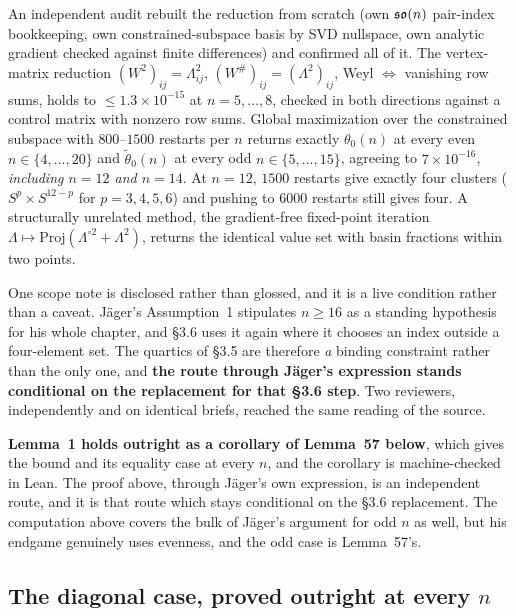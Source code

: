 \begin{certificate}
An independent audit rebuilt the reduction from scratch (own $\mathfrak{so}(n)$ pair-index bookkeeping, own constrained-subspace basis by SVD nullspace, own analytic gradient checked against finite differences) and confirmed all of it. The vertex-matrix reduction $(W^2)_{ij}=\Lambda_{ij}^2$, $(W^{\#})_{ij}=(\Lambda^2)_{ij}$, Weyl $\iff$ vanishing row sums, holds to $\le1.3\times10^{-15}$ at $n=5,\dots,8$, checked in both directions against a control matrix with nonzero row sums. Global maximization over the constrained subspace with $800$--$1500$ restarts per $n$ returns exactly $\theta_0(n)$ at every even $n\in\{4,\dots,20\}$ and $\tilde\theta_0(n)$ at every odd $n\in\{5,\dots,15\}$, agreeing to $7\times10^{-16}$, \emph{including $n=12$ and $n=14$}. At $n=12$, $1500$ restarts give exactly four clusters ($S^p\times S^{12-p}$ for $p=3,4,5,6$) and pushing to $6000$ restarts still gives four. A structurally unrelated method, the gradient-free fixed-point iteration $\Lambda\mapsto\mathrm{Proj}(\Lambda^{\circ2}+\Lambda^2)$, returns the identical value set with basin fractions within two points.

One scope note is disclosed rather than glossed, and it is a live condition rather than a caveat. J\"ager's Assumption~1 stipulates $n\ge16$ as a standing hypothesis for his whole chapter, and \S3.6 uses it again where it chooses an index outside a four-element set. The quartics of \S3.5 are therefore \emph{a} binding constraint rather than the only one, and \textbf{the route through J\"ager's expression stands conditional on the replacement for that \S3.6 step}. Two reviewers, independently and on identical briefs, reached the same reading of the source.
\end{certificate}

\textbf{Lemma~1 holds outright as a corollary of Lemma~57 below}, which gives the bound and its equality case at every $n$, and the corollary is machine-checked in Lean. The proof above, through J\"ager's own expression, is an independent route, and it is that route which stays conditional on the \S3.6 replacement. The computation above covers the bulk of J\"ager's argument for odd $n$ as well, but his endgame genuinely uses evenness, and the odd case is Lemma~57's.

\subsection{The diagonal case, proved outright at every \texorpdfstring{$n$}{n}}\label{sec:alldiag}

